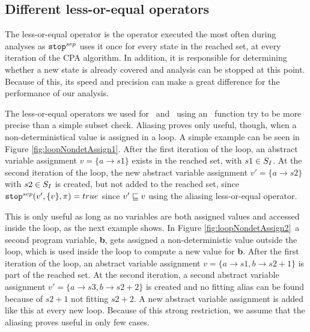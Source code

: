\subsection{Different less-or-equal operators}
The less-or-equal operator is the operator executed the most often during analyses as $\texttt{stop}^{sep}$ uses it once for every state in the reached set, at every iteration of the CPA algorithm.
In addition, it is responsible for determining whether a new state is already covered and analysis can be stopped at this point.
Because of this, its speed and precision can make a great difference for the performance of our analysis.

The  less-or-equal operators we used for \symbolicValueAnalysisCPA\ and \constraintsCPA\ using an \aliasFunc\ function try to be more precise than a simple subset check.
Aliasing proves only useful, though, when a non-deterministical value is assigned in a loop. A simple example can be seen in Figure \ref{fig:loopNondetAssign1}.
After the first iteration of the loop, an abstract variable assignment $v = \{ a \rightarrow s1 \}$ exists in the reached set, with $s1 \in S_I$.
At the second iteration of the loop, the new abstract variable assignment $v' = \{ a \rightarrow s2 \}$ with $s2 \in S_I$ is created, but not added to the reached set, since $\texttt{stop}^{sep}(v', \{ v \}, \pi) = true$ since $v' \sqsubseteq v$ using the aliasing less-or-equal operator.

This is only useful as long as no variables are both assigned values and accessed inside the loop, as the next example shows. In Figure \ref{fig:loopNondetAssign2}\ a second program variable, \textbf{b}, gets assigned a non-deterministic value outside the loop, which is used inside the loop to compute a new value for \textbf{b}.
After the first iteration of the loop, an abstract variable assignment $v = \{ a \rightarrow s1, b \rightarrow s2 + 1 \}$ is part of the reached set.
At the second iteration, a second abstract variable assignment $v' = \{ a \rightarrow s3, b \rightarrow s2 + 2 \}$ is created and no fitting alias can be found because of $s2 + 1$ not fitting $s2 + 2$.
A new abstract variable assignment is added like this at every new loop.
Because of this strong restriction, we assume that the aliasing proves useful in only few cases.

